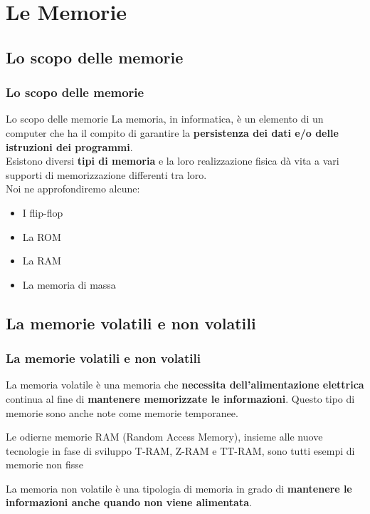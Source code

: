 \section[Le Memorie]{Le Memorie}
\label{sec:memory}


\subsection[Lo scopo delle memorie]{Lo scopo delle memorie}
\begin{frame}
	\frametitle{Lo scopo delle memorie}
	
	\begin{block}{Lo scopo delle memorie}
		La memoria, in informatica, è un elemento di un computer che ha il compito di garantire la \textbf{persistenza dei dati e/o delle istruzioni dei programmi}.\\\vspace{0.5em}
		Esistono diversi \textbf{tipi di memoria} e la loro realizzazione fisica dà vita a vari supporti di memorizzazione differenti tra loro.\\\vspace{0.5em}
		Noi ne approfondiremo alcune:
		
		\begin{itemize}
			\item I flip-flop
			\item La ROM
			\item La RAM
			\item La memoria di massa
		\end{itemize}
		
	\end{block}
	
\end{frame}


\subsection[La memorie volatili e non volatili]{La memorie volatili e non volatili}
\begin{frame}
	\frametitle{La memorie volatili e non volatili}
	 
	\begin{block}{La memoria volatile}
		è una memoria che \textbf{necessita dell'alimentazione elettrica} continua al fine di \textbf{mantenere memorizzate le informazioni}. Questo tipo di memorie sono anche note come memorie temporanee.\\\vspace{0.5em}

		Le odierne memorie RAM (Random Access Memory), insieme alle nuove tecnologie in fase di sviluppo T-RAM, Z-RAM e TT-RAM, sono tutti esempi di memorie non fisse
	\end{block}
	
	\begin{block}{La memoria non volatile}
		è una tipologia di memoria in grado di \textbf{mantenere le informazioni anche quando non viene alimentata}.
	\end{block}
	
\end{frame}


